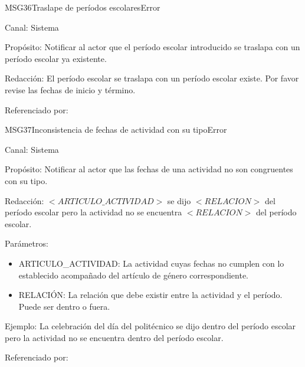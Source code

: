 \begin{mensaje}{MSG36}{Traslape de períodos escolares}{Error}
	\item[Canal:] Sistema
	\item[Propósito:] Notificar al actor que el período escolar introducido se traslapa con un período escolar ya existente.
	\item[Redacción:] El período escolar se traslapa con un período escolar existe. Por favor revise las fechas de inicio y término.
	\item[Referenciado por:] 
\end{mensaje}


\begin{mensaje}{MSG37}{Inconsistencia de fechas de actividad con su tipo}{Error}
	\item[Canal:] Sistema
	\item[Propósito:] Notificar al actor que las fechas de una actividad no son congruentes con su tipo.
	\item[Redacción:] $<ARTICULO\_ACTIVIDAD>$ se dijo $<RELACION>$ del período escolar pero la actividad no se encuentra $<RELACION>$ del período escolar.
	\item[Parámetros:] 
	\begin{itemize}
		\item ARTICULO\_ACTIVIDAD: La actividad cuyas fechas no cumplen con lo establecido acompañado del artículo de género correspondiente.
		\item RELACIÓN: La relación que debe existir entre la actividad y el período. Puede ser dentro o fuera.
	\end{itemize}
	\item[Ejemplo:] La celebración del día del politécnico se dijo dentro del período escolar  pero la actividad no se encuentra dentro del período escolar.
	\item[Referenciado por:] 
\end{mensaje}

